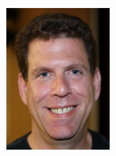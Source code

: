 \documentclass[conference]{IEEEtran}
\begin{document}
\begin{figure}
\vspace{-\intextsep}
\includegraphics[width=1.0\linewidth]{images/BrianMitchell.jpeg}
\vspace{-20pt} 
\label{fig:BrianMitchell}
\end{figure}
 
\end{document}
